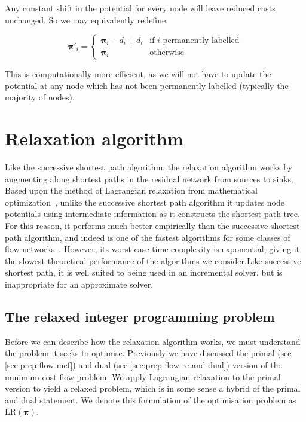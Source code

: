 Any constant shift in the potential for every node will leave reduced costs unchanged. So we may equivalently redefine:

\[\boldsymbol{\pi}'_{i}=\begin{cases}
\boldsymbol{\pi}_{i}-d_i+d_l & \text{if $i$ permanently labelled}\\
\boldsymbol{\pi}_{i} & \text{otherwise}
\end{cases}\]

This is computationally more efficient, as we will not have to update the potential at any node which has not been permanently labelled (typically the majority of nodes).

\section{Relaxation algorithm} \label{sec:impl-relax}

Like the successive shortest path algorithm, the relaxation algorithm works by augmenting along shortest paths in the residual network from sources to sinks. Based upon the method of Lagrangian relaxation from mathematical optimization~\cite[ch.~16]{Ahuja:1993}\cite{Fisher:1981}, unlike the successive shortest path algorithm it updates node potentials using intermediate information as it constructs the shortest-path tree. For this reason, it performs much better empirically than the successive shortest path algorithm, and indeed is one of the fastest algorithms for some classes of flow networks~\cite{KiralyKovacs:2012}. However, its worst-case time complexity is exponential, giving it the slowest theoretical performance of the algorithms we consider.\footnotemark Like successive shortest path, it is well suited to being used in an incremental solver, but is inappropriate for an approximate solver.


\subsection{The relaxed integer programming problem}
Before we can describe how the relaxation algorithm works, we must understand the problem it seeks to optimise. Previously we have discussed the primal (see \cref{sec:prep-flow-mcf}) and dual (see \cref{sec:prep-flow-rc-and-dual}) version of the minimum-cost flow problem. We apply Lagrangian relaxation to the primal version to yield a relaxed problem, which is in some sense a hybrid of the primal and dual statement. We denote this formulation of the optimisation problem as $\mathrm{LR}(\boldsymbol{\pi})$.

